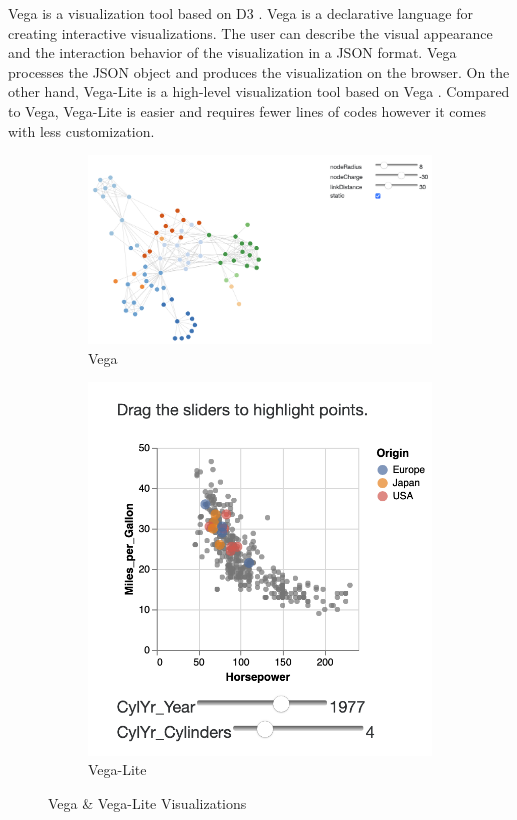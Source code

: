 Vega is a visualization tool based on D3 \cite{2016-reactive-vega-architecture}. Vega is a declarative language for creating interactive visualizations. The user can describe the visual appearance and the interaction behavior of the visualization in a JSON format. Vega processes the JSON object and produces the visualization on the browser. On the other hand, Vega-Lite is a high-level visualization tool based on Vega \cite{2017-vega-lite}. Compared to Vega, Vega-Lite is easier and requires fewer lines of codes however it comes with less customization.

\begin{figure}[h]
\begin{subfigure}{.5\textwidth}
  \centering
  \captionsetup{justification=centering}
  \includegraphics[width=1\linewidth]{Report-latex/tex_files/pics/vega.png}  
  \caption{Vega \cite{vega}}
  \label{fig:sub-first}
\end{subfigure}
\begin{subfigure}{.5\textwidth}
  \centering
  \captionsetup{justification=centering}
  \includegraphics[width=.5\linewidth]{Report-latex/tex_files/pics/vegalite.png}  
  \caption{Vega-Lite \cite{vegalite}}
  \label{fig:sub-second}
\end{subfigure}
\captionsetup{justification=centering}
\caption{Vega \& Vega-Lite Visualizations}

\label{fig:viga-vigalite}
\end{figure}

